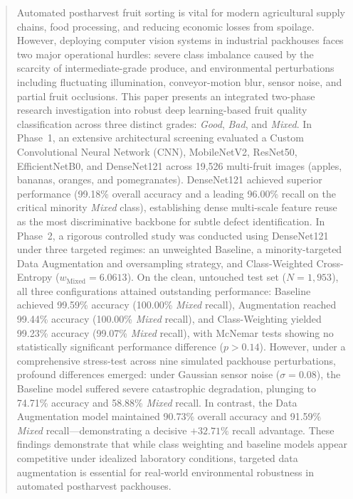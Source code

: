 \documentclass[conference]{IEEEtran}
\begin{document}
\begin{abstract}
Automated postharvest fruit sorting is vital for modern agricultural supply chains, food processing, and reducing economic losses from spoilage. However, deploying computer vision systems in industrial packhouses faces two major operational hurdles: severe class imbalance caused by the scarcity of intermediate-grade produce, and environmental perturbations including fluctuating illumination, conveyor-motion blur, sensor noise, and partial fruit occlusions. This paper presents an integrated two-phase research investigation into robust deep learning-based fruit quality classification across three distinct grades: \textit{Good}, \textit{Bad}, and \textit{Mixed}. In Phase~1, an extensive architectural screening evaluated a Custom Convolutional Neural Network (CNN), MobileNetV2, ResNet50, EfficientNetB0, and DenseNet121 across 19,526 multi-fruit images (apples, bananas, oranges, and pomegranates). DenseNet121 achieved superior performance (99.18\% overall accuracy and a leading 96.00\% recall on the critical minority \textit{Mixed} class), establishing dense multi-scale feature reuse as the most discriminative backbone for subtle defect identification. In Phase~2, a rigorous controlled study was conducted using DenseNet121 under three targeted regimes: an unweighted Baseline, a minority-targeted Data Augmentation and oversampling strategy, and Class-Weighted Cross-Entropy ($w_{\text{Mixed}}=6.0613$). On the clean, untouched test set ($N=1,953$), all three configurations attained outstanding performance: Baseline achieved 99.59\% accuracy (100.00\% \textit{Mixed} recall), Augmentation reached 99.44\% accuracy (100.00\% \textit{Mixed} recall), and Class-Weighting yielded 99.23\% accuracy (99.07\% \textit{Mixed} recall), with McNemar tests showing no statistically significant performance difference ($p>0.14$). However, under a comprehensive stress-test across nine simulated packhouse perturbations, profound differences emerged: under Gaussian sensor noise ($\sigma=0.08$), the Baseline model suffered severe catastrophic degradation, plunging to 74.71\% accuracy and 58.88\% \textit{Mixed} recall. In contrast, the Data Augmentation model maintained 90.73\% overall accuracy and 91.59\% \textit{Mixed} recall—demonstrating a decisive $+32.71\%$ recall advantage. These findings demonstrate that while class weighting and baseline models appear competitive under idealized laboratory conditions, targeted data augmentation is essential for real-world environmental robustness in automated postharvest packhouses.
\end{abstract}
\end{document}

